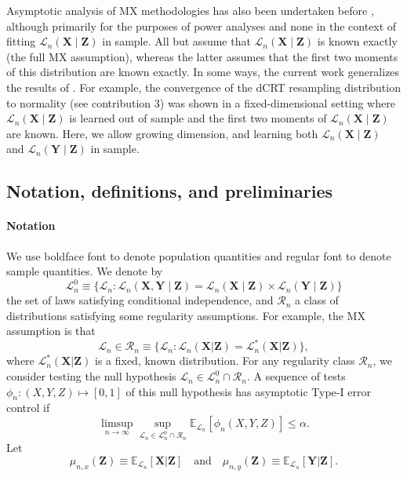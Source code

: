 \documentclass[aos]{imsart}
\theoremstyle{plain}
\theoremstyle{remark}
\newcommand{\E}{\mathbb E}								%
\newcommand{\prx}{\bm X}								%
\newcommand{\srx}{X}									%
\newcommand{\prz}{\bm Z}								%
\newcommand{\srz}{Z}									%
\newcommand{\pry}{{\bm Y}}								%
\newcommand{\sry}{Y}									%
\newcommand{\law}{\mathcal L}							%
\newcommand{\nulllaws}{\mathscr L^0}					%
\newcommand{\regclass}{\mathscr R}					    %
\begin{document}
Asymptotic analysis of MX methodologies has also been undertaken before \citep{Weinstein2017, Liu2019, Weinstein2020, Katsevich2020a, Wang2020b}, although primarily for the purposes of power analyses and none in the context of fitting $\law_n(\prx \mid \prz)$ in sample. All but \citet{Katsevich2020a} assume that $\law_n(\prx \mid \prz)$ is known exactly (the full MX assumption), whereas the latter assumes that the first two moments of this distribution are known exactly. In some ways, the current work generalizes the results of \citet{Katsevich2020a}. For example, the convergence of the dCRT resampling distribution to normality (see contribution 3) was shown in a fixed-dimensional setting where $\law_n(\prx \mid \prz)$ is learned out of sample and the first two moments of $\law_n(\prx \mid \prz)$ are known. Here, we allow growing dimension, and learning both $\law_n(\prx \mid \prz)$ and $\law_n(\pry \mid \prz)$ in sample.

\subsection{Notation, definitions, and preliminaries} \label{sec:notation-definitions-preliminaries}

\paragraph*{Notation}

We use boldface font to denote population quantities and regular font to denote sample quantities. We denote by 
\begin{equation}
    \nulllaws_n \equiv \{\law_n: \law_n(\prx, \pry \mid \prz) = \law_n(\prx\mid\prz) \times \law_n(\pry\mid\prz)\}
\end{equation}
the set of laws satisfying conditional independence, and $\regclass_n$ a class of distributions satisfying some regularity assumptions. For example, the MX assumption is that 
\begin{equation*}
\law_n \in \regclass_n \equiv \{\law_n: \law_n(\prx | \prz) = \law_n^*(\prx | \prz)\}, 
\end{equation*}
where $\law_n^*(\prx | \prz)$ is a fixed, known distribution. For any regularity class $\regclass_n$, we consider testing the null hypothesis $\law_n \in \nulllaws_n \cap \regclass_n$. A sequence of tests $\phi_n: (\srx, \sry, \srz) \mapsto [0,1]$ of this null hypothesis has asymptotic Type-I error control if
\begin{equation}
    \limsup_{n \rightarrow \infty}\sup_{\law_n \in \nulllaws_n \cap \regclass_n} \E_{\law_n}[\phi_n(\srx,\sry,\srz)] \leq \alpha.
    \label{eq:asymptotic-control}
\end{equation}
Let
\begin{equation}
    \mu_{n,x}(\prz) \equiv \E_{\law_n}[\prx|\prz] \quad \text{and} \quad \mu_{n,y}(\prz) \equiv \E_{\law_n}[\pry|\prz].
\end{equation}
\end{document}
